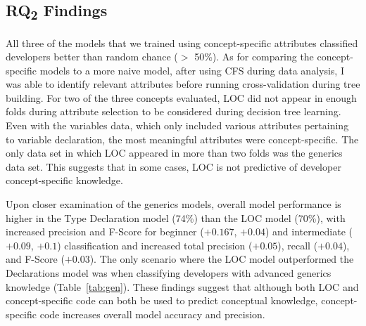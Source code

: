 \vspace{1em}

\vspace{0.5em}


\subsection{RQ\textsubscript{2} Findings}

All three of the models that we trained using concept-specific attributes classified developers better than random chance ($>$ 50\%).
As for comparing the concept-specific models to a more naive model, after using CFS during data analysis, I was able to identify relevant attributes before running cross-validation during tree building. For two of the three concepts evaluated, LOC did not appear in enough folds during attribute selection to be considered during decision tree learning. Even with the variables data, which only included various attributes pertaining to variable declaration, the most meaningful attributes were concept-specific. The only data set in which LOC appeared in more than two folds was the generics data set. This suggests that in some cases, LOC is not predictive of developer concept-specific knowledge.

Upon closer examination of the generics models, overall model performance is higher in the Type Declaration model (74\%) than the LOC model (70\%), with increased precision and F-Score for beginner (\(+ 0.167\), \(+ 0.04\)) and intermediate (\(+ 0.09\), \(+ 0.1\)) classification and increased total precision (\(+ 0.05\)), recall (\(+ 0.04\)), and F-Score (\(+ 0.03\)). 
The only scenario where the LOC model outperformed the Declarations model was when classifying developers with advanced generics knowledge (Table~\ref{tab:gen}). 
These findings suggest that although both LOC and concept-specific code can both be used to predict conceptual knowledge, concept-specific code increases overall model accuracy and precision.

\vspace{1em}

\vspace{0.5em}


